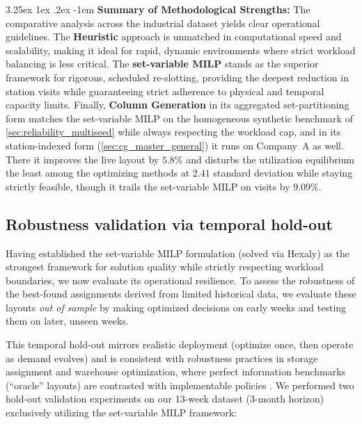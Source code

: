 \documentclass[preprint,review,11pt,authoryear]{elsarticle}
\makeatletter
\renewcommand\paragraph{\@startsection{paragraph}{4}{\z@}
  {3.25ex \@plus1ex \@minus.2ex}
  {-1em}
  {\normalfont\normalsize\itshape}}
\makeatother
\begin{document}
\paragraph{\textbf{Summary of Methodological Strengths: }}
The comparative analysis across the industrial dataset yields clear operational guidelines. The \textbf{Heuristic} approach is unmatched in computational speed and scalability, making it ideal for rapid, dynamic environments where strict workload balancing is less critical. The \textbf{set-variable MILP} stands as the superior framework for rigorous, scheduled re-slotting, providing the deepest reduction in station visits while guaranteeing strict adherence to physical and temporal capacity limits. Finally, \textbf{Column Generation} in its aggregated set-partitioning form matches the set-variable MILP on the homogeneous synthetic benchmark of \cref{sec:reliability_multiseed} while always respecting the workload cap, and in its station-indexed form (\cref{sec:cg_master_general}) it runs on Company~A as well. There it improves the live layout by $5.8\%$ and disturbs the utilization equilibrium the least among the optimizing methods at $2.41$ standard deviation while staying strictly feasible, though it trails the set-variable MILP on visits by $9.09\%$.

\subsection{Robustness validation via temporal hold-out}\label{sec:temporal_validation}

Having established the set-variable MILP formulation (solved via Hexaly) as the strongest framework for solution quality while strictly respecting workload boundaries, we now evaluate its operational resilience. To assess the robustness of the best-found assignments derived from limited historical data, we evaluate these layouts \emph{out of sample} by making optimized decisions on early weeks and testing them on later, unseen weeks.

This temporal hold-out mirrors realistic deployment (optimize once, then operate as demand evolves) and is consistent with robustness practices in storage assignment and warehouse optimization, where perfect information benchmarks (``oracle'' layouts) are contrasted with implementable policies \cite{lee2020cie,wang2020}. We performed two hold-out validation experiments on our 13-week dataset (3-month horizon) exclusively utilizing the set-variable MILP framework:
\end{document}
